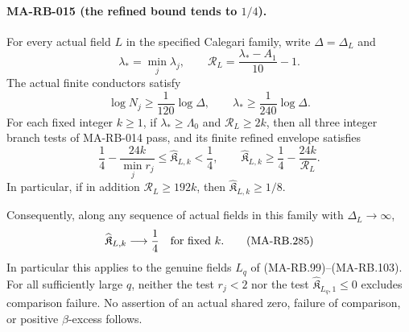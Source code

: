 \paragraph{MA-RB-015 (the refined bound tends to \(1/4\)).}
For every actual field \(L\) in the specified Calegari family,
write \(\Delta=\Delta_L\) and
\[
 \lambda_* =\min_j\lambda_j,\qquad
 \mathcal R_L=\frac{\lambda_*-A_1}{10}-1.
 \tag{MA-RB.282}
\]
The actual finite conductors satisfy
\[
                 \log N_j\ge\frac1{120}\log\Delta,
       \qquad \lambda_*\ge\frac1{240}\log\Delta.
 \tag{MA-RB.283}
\]
For each fixed integer \(k\ge1\), if
\(\lambda_*\ge\Lambda_0\) and \(\mathcal R_L\ge2k\),
then all three integer branch tests of MA-RB-014 pass,
and its finite refined envelope satisfies
\[
 \frac14-\frac{24k}{\min_j r_j}
       \le\widehat{\mathfrak K}_{L,k}<\frac14,
 \qquad
 \widehat{\mathfrak K}_{L,k}
       \ge\frac14-\frac{24k}{\mathcal R_L}.
 \tag{MA-RB.284}
\]
In particular, if in addition \(\mathcal R_L\ge192k\),
then \(\widehat{\mathfrak K}_{L,k}\ge1/8\).

Consequently, along any sequence of actual fields in this
family with \(\Delta_L\to\infty\),
\[
          \widehat{\mathfrak K}_{L,k}\longrightarrow\frac14
                                  \quad\hbox{for fixed }k.
 \tag{MA-RB.285}
\]
In particular this applies to the genuine fields \(L_q\)
of (MA-RB.99)--(MA-RB.103). For all sufficiently large
\(q\), neither the test \(r_j<2\) nor the test
\(\widehat{\mathfrak K}_{L_q,1}\le0\) excludes comparison
failure. No assertion of an actual shared zero, failure of
comparison, or positive \(\beta\)-excess follows.

